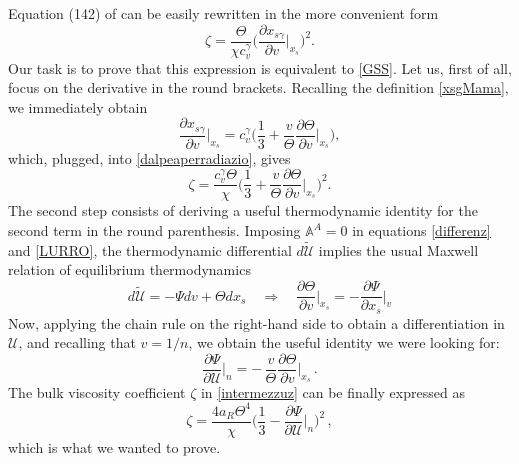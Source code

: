 \documentclass[a4paper, amsfonts, amssymb, amsmath, reprint, twocolumn, showkeys, nofootinbib]{revtex4-2}
\begin{document}
Equation (142) of \citet{GavassinoRadiazione} can be easily rewritten in the more convenient form
\begin{equation}\label{dalpeaperradiazio}
\zeta = \dfrac{\Theta}{\chi c_v^\gamma} \bigg( \dfrac{\partial x_{s\gamma}}{\partial v} \bigg|_{x_s} \bigg)^2.
\end{equation}  
Our task is to prove that this expression is equivalent to \eqref{GSS}.
Let us, first of all, focus on the derivative in the round brackets. Recalling the definition \eqref{xsgMama}, we immediately obtain
\begin{equation}
\dfrac{\partial x_{s\gamma}}{\partial v} \bigg|_{x_s} = c_v^\gamma \bigg( \dfrac{1}{3} + \dfrac{v}{\Theta} \dfrac{\partial \Theta}{\partial v} \bigg|_{x_s}  \bigg),
\end{equation}
which, plugged, into \eqref{dalpeaperradiazio}, gives
\begin{equation}\label{intermezzuz}
\zeta = \dfrac{c_v^\gamma \Theta}{\chi}  \bigg( \dfrac{1}{3} + \dfrac{v}{\Theta} \dfrac{\partial \Theta}{\partial v} \bigg|_{x_s}  \bigg)^2.
\end{equation}
The second step consists of deriving a useful thermodynamic identity for the second term in the round parenthesis. Imposing $\mathbb{A}^A =0$ in equations \eqref{differenz} and \eqref{LURRO}, the thermodynamic differential $d\tilde{\mathcal{U}}$ implies the usual  Maxwell relation of equilibrium thermodynamics
\begin{equation}
d \tilde{\mathcal{U}} = -\Psi dv +\Theta dx_s  
\quad   \Rightarrow   \quad
\dfrac{\partial \Theta}{\partial v} \bigg|_{x_s} \!\! =   - \dfrac{\partial \Psi}{\partial x_s} \bigg|_v 
\end{equation}
Now, applying the chain rule on the right-hand side to obtain a differentiation in $\mathcal{U}$, and recalling that $v=1/n$, we obtain the useful identity we were looking for:
\begin{equation}
\dfrac{\partial \Psi}{\partial \mathcal{U}} \bigg|_n = - \, \dfrac{v}{\Theta} \dfrac{\partial \Theta}{\partial v} \bigg|_{x_s} \, .
\end{equation}
The bulk viscosity coefficient $\zeta$ in \eqref{intermezzuz} can be finally expressed as 
\begin{equation}
\zeta = \dfrac{4 a_R \Theta^4}{\chi}  \bigg( \dfrac{1}{3} - \dfrac{\partial \Psi}{\partial \mathcal{U}} \bigg|_n \bigg)^2 \, ,
\end{equation}
which is what we wanted to prove.



%

\end{document}
